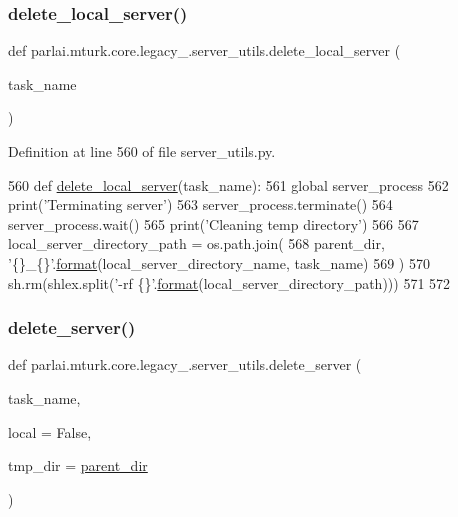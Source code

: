 \subsubsection{\texorpdfstring{delete\+\_\+local\+\_\+server()}{delete\_local\_server()}}
{\footnotesize\ttfamily def parlai.\+mturk.\+core.\+legacy\+\_.\+server\+\_\+utils.\+delete\+\_\+local\+\_\+server (\begin{DoxyParamCaption}\item[{}]{task\+\_\+name }\end{DoxyParamCaption})}



Definition at line 560 of file server\+\_\+utils.\+py.


\begin{DoxyCode}
560 \textcolor{keyword}{def }\hyperlink{namespaceparlai_1_1mturk_1_1core_1_1server__utils_a9b4f4c3f696be001c2fa96b3690af83c}{delete\_local\_server}(task\_name):
561     \textcolor{keyword}{global} server\_process
562     print(\textcolor{stringliteral}{'Terminating server'})
563     server\_process.terminate()
564     server\_process.wait()
565     print(\textcolor{stringliteral}{'Cleaning temp directory'})
566 
567     local\_server\_directory\_path = os.path.join(
568         parent\_dir, \textcolor{stringliteral}{'\{\}\_\{\}'}.\hyperlink{namespaceparlai_1_1chat__service_1_1services_1_1messenger_1_1shared__utils_a32e2e2022b824fbaf80c747160b52a76}{format}(local\_server\_directory\_name, task\_name)
569     )
570     sh.rm(shlex.split(\textcolor{stringliteral}{'-rf \{\}'}.\hyperlink{namespaceparlai_1_1chat__service_1_1services_1_1messenger_1_1shared__utils_a32e2e2022b824fbaf80c747160b52a76}{format}(local\_server\_directory\_path)))
571 
572 
\end{DoxyCode}
\mbox{\label{namespaceparlai_1_1mturk_1_1core_1_1legacy__2018_1_1server__utils_a034c68a129a95ca47005fc7f81bdfc09}} 
\subsubsection{\texorpdfstring{delete\+\_\+server()}{delete\_server()}}
{\footnotesize\ttfamily def parlai.\+mturk.\+core.\+legacy\+\_.\+server\+\_\+utils.\+delete\+\_\+server (\begin{DoxyParamCaption}\item[{}]{task\+\_\+name,  }\item[{}]{local = {\ttfamily False},  }\item[{}]{tmp\+\_\+dir = {\ttfamily \hyperlink{namespaceparlai_1_1mturk_1_1core_1_1legacy__2018_1_1server__utils_a6a871d2f8e5c0768a82ab8fa2e7fadae}{parent\+\_\+dir}} }\end{DoxyParamCaption})}



